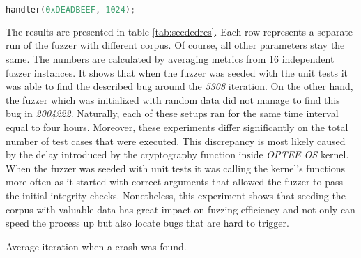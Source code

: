 \begin{minipage}{\linewidth}
    \begin{lstlisting}[language=rust,caption={Unit test for the \textit{handler} function.},label={lst:uthandler}]
handler(0xDEADBEEF, 1024);
    \end{lstlisting}
\end{minipage}

The results are presented in table \ref{tab:seededres}. Each row represents a separate run of the fuzzer with different corpus. Of course, all other parameters stay the same. The numbers are calculated by averaging metrics from 16 independent fuzzer instances. It shows that when the fuzzer was seeded with the unit tests it was able to find the described bug around the \textit{5308} iteration. On the other hand, the fuzzer which was initialized with random data did not manage to find this bug in \textit{2004222}. Naturally, each of these setups ran for the same time interval equal to four hours. Moreover, these experiments differ significantly on the total number of test cases that were executed. This discrepancy is most likely caused by the delay introduced by the cryptography function inside \textit{OPTEE OS} kernel. When the fuzzer was seeded with unit tests it was calling the kernel's functions more often as it started with correct arguments that allowed the fuzzer to pass the initial integrity checks. Nonetheless, this experiment shows that seeding the corpus with valuable data has great impact on fuzzing efficiency and not only can speed the process up but also locate bugs that are hard to trigger.

\begin{table}
    \centering
    
    \caption{Average iteration when a crash was found.}
    \label{tab:seededres}
\end{table}
